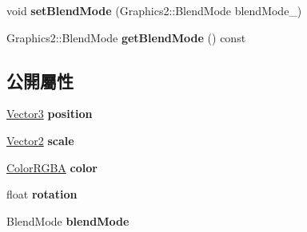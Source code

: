\begin{DoxyCompactItemize}
\item 
void {\bfseries set\+Blend\+Mode} (Graphics2\+::\+Blend\+Mode blend\+Mode\+\_\+)\hypertarget{class_magnum_1_1_graphics2_a99d881e73fe1ceb309e0db152e884cb6}{}\label{class_magnum_1_1_graphics2_a99d881e73fe1ceb309e0db152e884cb6}

\item 
Graphics2\+::\+Blend\+Mode {\bfseries get\+Blend\+Mode} () const \hypertarget{class_magnum_1_1_graphics2_ae18b7ea97894b285c105455cc5e74a65}{}\label{class_magnum_1_1_graphics2_ae18b7ea97894b285c105455cc5e74a65}

\end{DoxyCompactItemize}
\subsection*{公開屬性}
\begin{DoxyCompactItemize}
\item 
\hyperlink{class_magnum_1_1_vector3}{Vector3} {\bfseries position}\hypertarget{class_magnum_1_1_graphics2_a49e91c92d3f30b2b800eca077738a5c3}{}\label{class_magnum_1_1_graphics2_a49e91c92d3f30b2b800eca077738a5c3}

\item 
\hyperlink{class_magnum_1_1_vector2}{Vector2} {\bfseries scale}\hypertarget{class_magnum_1_1_graphics2_ab062e51a9721de62e47c4f8a8c892be4}{}\label{class_magnum_1_1_graphics2_ab062e51a9721de62e47c4f8a8c892be4}

\item 
\hyperlink{class_magnum_1_1_color_r_g_b_a}{Color\+R\+G\+BA} {\bfseries color}\hypertarget{class_magnum_1_1_graphics2_af25438b02f6ac93fac274ec8c5e4493f}{}\label{class_magnum_1_1_graphics2_af25438b02f6ac93fac274ec8c5e4493f}

\item 
float {\bfseries rotation}\hypertarget{class_magnum_1_1_graphics2_a815d13330aa4caf9c6fe06d9b896b71a}{}\label{class_magnum_1_1_graphics2_a815d13330aa4caf9c6fe06d9b896b71a}

\item 
Blend\+Mode {\bfseries blend\+Mode}\hypertarget{class_magnum_1_1_graphics2_a543ceaafc065391cf8a404b01561b4e8}{}\label{class_magnum_1_1_graphics2_a543ceaafc065391cf8a404b01561b4e8}

\end{DoxyCompactItemize}
